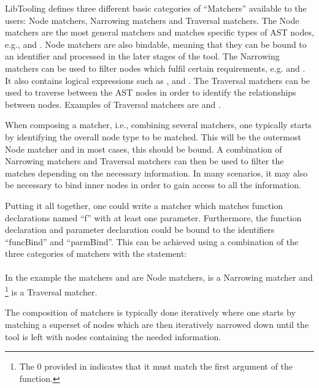 LibTooling defines three different basic categories of ``Matchers'' available to the users: Node matchers, Narrowing matchers and Traversal matchers.
The Node matchers are the most general matchers and matches specific types of AST nodes, e.g.,  and . Node matchers are also bindable, meaning that they can be bound to an identifier and processed in the later stages of the tool.
The Narrowing matchers can be used to filter nodes which fulfil certain requirements, e.g.  and . It also contains logical expressions such as , and .
The Traversal matchers can be used to traverse between the AST nodes in order to identify the relationships between nodes.
Examples of Traversal matchers are  and  \cite{clangASTMatcherReference}.

When composing a matcher, i.e., combining several matchers, one typically starts by identifying the overall node type to be matched. This will be the outermost Node matcher and in most cases, this should be bound.
A combination of Narrowing matchers and Traversal matchers can then be used to filter the matches depending on the necessary information.
In many scenarios, it may also be necessary to bind inner nodes in order to gain access to all the information.

Putting it all together, one could write a matcher which matches function declarations named ``f'' with at least one parameter. Furthermore, the function declaration and parameter declaration could be bound to the identifiers ``funcBind'' and ``parmBind''.
This can be achieved using a combination of the three categories of matchers with the statement:\\ \\
In the example the matchers  and  are Node matchers,  is a Narrowing matcher and \footnote{The 0 provided in  indicates that it must match the first argument of the function.} is a Traversal matcher.

The composition of matchers is typically done iteratively where one starts by matching a superset of nodes which are then iteratively narrowed down until the tool is left with nodes containing the needed information. 

